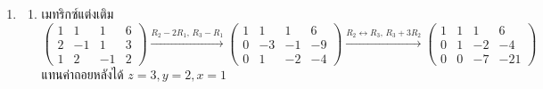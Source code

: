 \begin{enumerate}[label={},leftmargin=0pt,start=10]
\begin{enumerate}[label=\textbf{\thechapter.\arabic{enumi}.\arabic*}]
    \end{enumerate}
    \item
    \begin{enumerate}[label=\textbf{\thechapter.\arabic{enumi}.\arabic*}]
        \item เมทริกซ์แต่งเติม $\left(\begin{array}{ccc|c} 1 & 1 & 1 & 6 \\ 2 & -1 & 1 & 3 \\ 1 & 2 & -1 & 2 \end{array}\right) \xrightarrow{R_2-2R_1,\, R_3-R_1} \left(\begin{array}{ccc|c} 1 & 1 & 1 & 6 \\ 0 & -3 & -1 & -9 \\ 0 & 1 & -2 & -4 \end{array}\right) \xrightarrow{R_2 \leftrightarrow R_3,\, R_3+3R_2} \left(\begin{array}{ccc|c} 1 & 1 & 1 & 6 \\ 0 & 1 & -2 & -4 \\ 0 & 0 & -7 & -21 \end{array}\right)$ แทนค่าถอยหลังได้ $z = 3, y = 2, x = 1$
    \end{enumerate}
\end{enumerate}

